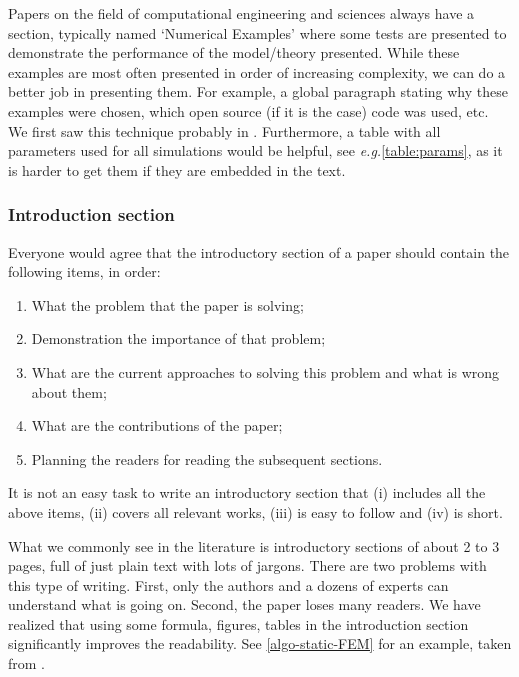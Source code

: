 \documentclass[authoryear,12pta4paper,fleqn]{article}
\newcommand{\eg}{\textit{e.g.}\xspace}
\numberwithin{equation}{section}
\theoremstyle{remark}
\begin{document}
Papers on the field of computational engineering and sciences always have a section, typically named `Numerical Examples' where some tests are presented to demonstrate the performance of the model/theory presented. While these examples are most often presented in order of increasing complexity, we can do a better job in presenting them. For example, a global paragraph stating why these examples were chosen, which open source (if it is the case) code was used, etc. We first saw this technique probably in \cite{huang2003modeling}. Furthermore, a table with all parameters used for all simulations would be helpful, see \eg \cref{table:params}, as it is harder to get them if they are embedded in the text.

\subsubsection{Introduction section}\label{sec:introduction-part}

Everyone would agree that the introductory section of a paper should contain the following items, in order:

\begin{enumerate}
\item What the problem that the paper is solving;
\item Demonstration the importance of that problem;
\item What are the current approaches to solving this problem and what is wrong about them;
\item What are the contributions of the paper; 
\item Planning  the readers for reading the subsequent sections.
\end{enumerate}

It is not an easy task to write an introductory section that (i) includes all the above items, (ii) covers all relevant works, (iii) is easy to follow and (iv) is short.

What we commonly see in the literature is introductory sections of about 2 to 3 pages, full of just plain text with lots of jargons. There are two problems with this type of writing. First, only the authors and a dozens of experts can understand what is going on. Second, the paper loses many readers. We have realized that using some formula, figures, tables in the introduction section significantly improves the readability.
See \cref{algo-static-FEM} for an example, taken from \cite{Mandal:EFM2019}.
\end{document}
